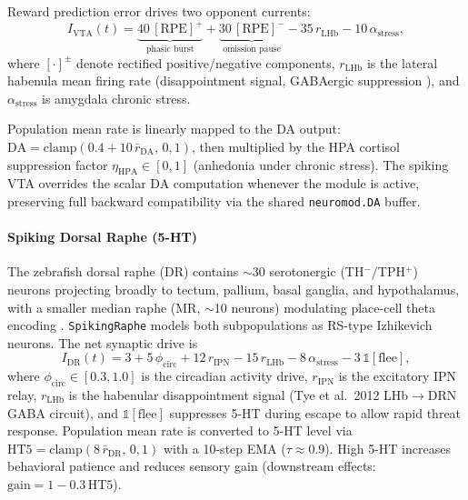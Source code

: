 \documentclass[12pt]{article}
\begin{document}
Reward prediction error drives two opponent currents:
\begin{equation}\label{eq:vta_drive}
  I_\text{VTA}(t) =
    \underbrace{40\,[\text{RPE}]^+}_{\text{phasic burst}}
  + \underbrace{30\,[\text{RPE}]^-}_{\text{omission pause}}
  - 35\,r_\text{LHb}
  - 10\,\alpha_\text{stress},
\end{equation}
where $[\cdot]^{\pm}$ denote rectified positive/negative components,
$r_\text{LHb}$ is the lateral habenula mean firing rate (disappointment
signal, GABAergic suppression \citep{matsumoto2007}),
and $\alpha_\text{stress}$ is amygdala chronic stress.
\begin{sloppypar}
Population mean rate is linearly mapped to the DA output:
$\text{DA} = \text{clamp}(0.4 + 10\,\bar{r}_\text{DA},\,0,1)$,
then multiplied by the HPA cortisol suppression factor
$\eta_\text{HPA} \in [0,1]$ (anhedonia under chronic stress).
The spiking VTA overrides the scalar DA computation whenever the module
is active, preserving full backward compatibility via the shared
\texttt{neuromod.DA} buffer.
\end{sloppypar}

\paragraph{Spiking Dorsal Raphe (5-HT)}

The zebrafish dorsal raphe (DR) contains $\sim$30 serotonergic (TH$^-$/TPH$^+$)
neurons projecting broadly to tectum, pallium, basal ganglia, and hypothalamus,
with a smaller median raphe (MR, $\sim$10 neurons) modulating place-cell
theta encoding \citep{lillesaar2011,yokogawa2012}.
\texttt{SpikingRaphe} models both subpopulations as RS-type Izhikevich neurons.
The net synaptic drive is
\begin{equation}\label{eq:raphe_drive}
  I_\text{DR}(t) = 3 + 5\,\phi_\text{circ}
                 + 12\,r_\text{IPN}
                 - 15\,r_\text{LHb}
                 - 8\,\alpha_\text{stress}
                 - 3\,\mathbb{1}[\text{flee}],
\end{equation}
where $\phi_\text{circ} \in [0.3,1.0]$ is the circadian activity drive,
$r_\text{IPN}$ is the excitatory IPN relay, $r_\text{LHb}$ is the habenular
disappointment signal (Tye et al.\ 2012 LHb$\to$DRN GABA circuit), and
$\mathbb{1}[\text{flee}]$ suppresses 5-HT during escape to allow rapid
threat response.
Population mean rate is converted to 5-HT level via
$\text{HT5} = \text{clamp}(8\,\bar{r}_\text{DR},\,0,1)$
with a 10-step EMA ($\tau \approx 0.9$).
High 5-HT increases behavioral patience and reduces sensory gain
(downstream effects: $\text{gain} = 1 - 0.3\,\text{HT5}$).
\end{document}
